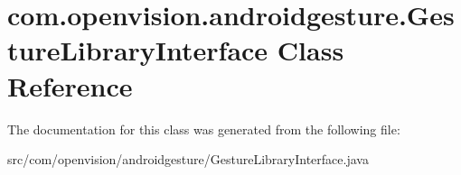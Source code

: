 \hypertarget{classcom_1_1openvision_1_1androidgesture_1_1GestureLibraryInterface}{\section{com.\-openvision.\-androidgesture.\-Gesture\-Library\-Interface \-Class \-Reference}
\label{classcom_1_1openvision_1_1androidgesture_1_1GestureLibraryInterface}
}


\-The documentation for this class was generated from the following file\-:\begin{DoxyCompactItemize}
\item 
src/com/openvision/androidgesture/\-Gesture\-Library\-Interface.\-java\end{DoxyCompactItemize}
